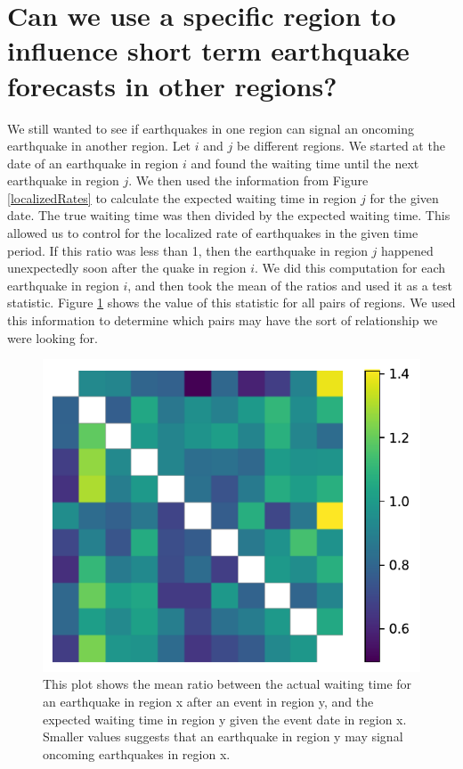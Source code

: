 \documentclass{article}
\begin{document}
\section{Can we use a specific region to influence short term earthquake forecasts in other regions?}


We still wanted to see if earthquakes in one region can signal an oncoming earthquake in another region. Let $i$ and $j$ be different regions. We started at the date of an earthquake in region $i$ and found the waiting time until the next earthquake in region $j$. We then used the information from Figure \ref{localizedRates} to calculate the expected waiting time in region $j$ for the given date. The true waiting time was then divided by the expected waiting time. This allowed us to control for the localized rate of earthquakes in the given time period. If this ratio was less than 1, then the earthquake in region $j$ happened unexpectedly soon after the quake in region $i$. We did this computation for each earthquake in region $i$, and then took the mean of the ratios and used it as a test statistic. Figure \ref{indicatorRatios} shows the value of this statistic for all pairs of regions. We used this information to determine which pairs may have the sort of relationship we were looking for. 



\begin{figure}
\centering
\includegraphics[scale=0.4]{indicatorRatios.pdf}
\caption{This plot shows the mean ratio between the actual waiting time for an earthquake in region x after an event in region y, and the expected waiting time in region y given the event date in region x. Smaller values suggests that an earthquake in region y may signal oncoming earthquakes in region x.}
\label{indicatorRatios}
\end{figure}
\end{document}
